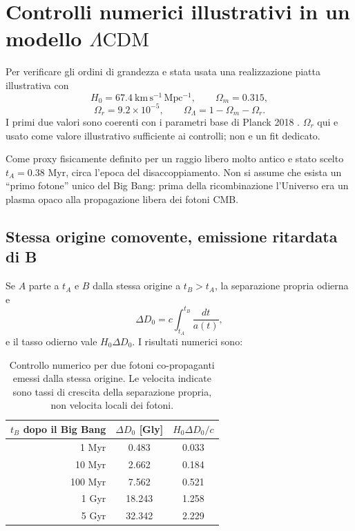 \documentclass[11pt,a4paper]{article}
\newcommand{\LCDM}{\ensuremath{\Lambda\mathrm{CDM}}}
\begin{document}
\section{Controlli numerici illustrativi in un modello \LCDM}

Per verificare gli ordini di grandezza e stata usata una realizzazione piatta illustrativa con
\begin{equation}
 H_0=67.4\ \mathrm{km\,s^{-1}\,Mpc^{-1}},\qquad \Omega_m=0.315,
\end{equation}
\begin{equation}
 \Omega_r=9.2\times10^{-5},\qquad \Omega_\Lambda=1-\Omega_m-\Omega_r.
\end{equation}
I primi due valori sono coerenti con i parametri base di Planck 2018 \cite{Planck2018}. $\Omega_r$ qui e usato come valore illustrativo sufficiente ai controlli; non e un fit dedicato.

Come proxy fisicamente definito per un raggio libero molto antico e stato scelto $t_A=0.38$ Myr, circa l'epoca del disaccoppiamento. Non si assume che esista un ``primo fotone'' unico del Big Bang: prima della ricombinazione l'Universo era un plasma opaco alla propagazione libera dei fotoni CMB.

\subsection{Stessa origine comovente, emissione ritardata di B}

Se $A$ parte a $t_A$ e $B$ dalla stessa origine a $t_B>t_A$, la separazione propria odierna e
\begin{equation}
 \Delta D_0=c\int_{t_A}^{t_B}\frac{dt}{a(t)},
\end{equation}
e il tasso odierno vale $H_0\Delta D_0$. I risultati numerici sono:

\begin{table}[ht]
\centering
\caption{Controllo numerico per due fotoni co-propaganti emessi dalla stessa origine. Le velocita indicate sono tassi di crescita della separazione propria, non velocita locali dei fotoni.}
\begin{tabular}{rcc}
\toprule
$t_B$ dopo il Big Bang & $\Delta D_0$ [Gly] & $H_0\Delta D_0/c$ \\
\midrule
1 Myr   & 0.483 & 0.033 \\
10 Myr  & 2.662 & 0.184 \\
100 Myr & 7.562 & 0.521 \\
1 Gyr   & 18.243 & 1.258 \\
5 Gyr   & 32.342 & 2.229 \\
\bottomrule
\end{tabular}
\label{tab:numeric_same_origin}
\end{table}
\end{document}
